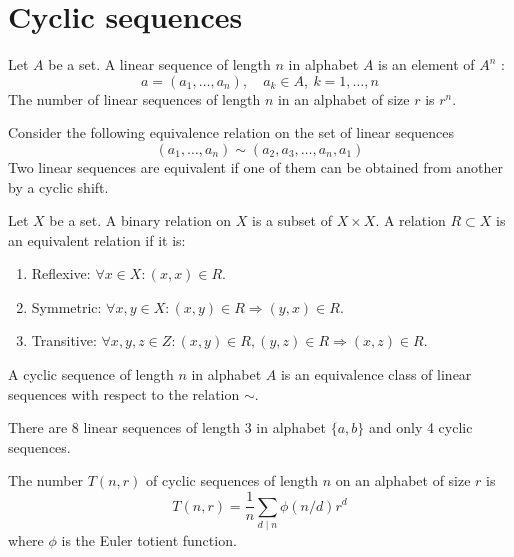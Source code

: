 \section{Cyclic sequences}
\begin{definition}
Let $A$ be a set. A linear sequence of length $n$ in alphabet $A$ is an element of $A^{n}$ :
$$
a=(a_{1},\dots,a_{n}),\quad a_{k}\in A,~k=1,\dots,n
$$
The number of linear sequences of length $n$ in an alphabet of size $r$ is $r^{n}$.

Consider the following equivalence relation on the set of linear sequences 
$$
(a_{1},\dots,a_{n})\sim (a_{2},a_{3},\dots,a_{n},a_{1})
$$
Two linear sequences are equivalent if one of them can be obtained from another by a cyclic shift.
\end{definition}
\begin{reminder}
Let $X$ be a set. A binary relation on $X$ is a subset of $X\times X$. A relation $R\subset X$ is an equivalent relation if it is:
\begin{enumerate}
\item Reflexive: $\forall x\in X: (x,x)\in R$.
\item Symmetric: $\forall x,y\in X:(x,y) \in R \Rightarrow(y,x)\in R$.
\item Transitive: $\forall x,y,z\in Z:(x,y)\in R,(y,z)\in R\Rightarrow(x,z)\in R$.
\end{enumerate}
\end{reminder}
\begin{definition}
A cyclic sequence of length $n$ in alphabet $A$ is an equivalence class of linear sequences with respect to the relation $\sim$.
\end{definition}
\begin{example}
There are 8 linear sequences of length 3 in alphabet $\{ a,b \}$ and only 4 cyclic sequences.
\end{example}
\begin{proposition}
The number $T(n,r)$ of cyclic sequences of length $n$ on an alphabet of size $r$ is
$$
T(n,r)=\frac{1}{n}\sum _{d\mid n} \phi(n/d)r^{d}
$$
where $\phi$ is the Euler totient function.
\end{proposition}
